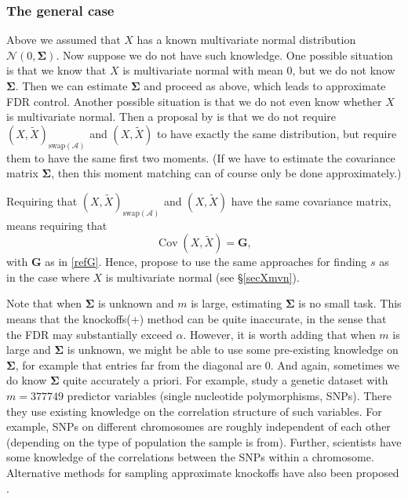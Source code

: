 \documentclass[11pt]{article}
\theoremstyle{plain}
\theoremstyle{definition}
\newcommand{\N}{\mathcal{N}}
\newcommand{\A}{\mathcal{A}}
\newcommand{\Sigm}{\mathbf{\Sigma}}
\newcommand{\citt}{\citet}
\newcommand{\citp}{\citep}
\DeclareMathOperator{\Cov}{Cov}
\begin{document}
\subsubsection{The general case}
Above we assumed that $X$ has a known multivariate normal distribution $\N(0,\Sigm)$. Now suppose we do not have such knowledge. One possible situation is that  we  know that $X$ is multivariate normal with mean 0, but we do not know $\Sigm$. Then we can estimate $\Sigm$ and proceed as above, which leads to approximate FDR control.
Another possible situation is that we do not even know whether $X$ is multivariate normal. Then a proposal by \citt{candes2018panning} is that we do not require $(X,\tilde{X})_{\text{swap}(\A)}$ and $(X,\tilde{X})$ to have exactly the same distribution, but require them to have the same first two moments. (If we have to estimate the covariance matrix $\Sigm$, then this moment matching can of course only be done approximately.)

Requiring that $(X,\tilde{X})_{\text{swap}(\A)}$ and $(X,\tilde{X})$ have the same covariance matrix, means requiring that $$\Cov(X,\tilde{X})=\mathbf{G},$$
with $\mathbf{G}$ as in \eqref{refG}. Hence, \citt[][pp.564-565]{candes2018panning} propose to use the same approaches for finding $s$ as in the case where $X$ is multivariate normal (see \S\ref{secXmvn}). 

Note that when $\Sigm$ is unknown and $m$ is large, estimating $\Sigm$ is no small task. This means that the knockoffs(+) method can be quite inaccurate, in the sense that the FDR may substantially exceed $\alpha$. However, it is worth adding that when $m$ is large and $\Sigm$ is unknown, we might be able to use some pre-existing knowledge on $\Sigm$, for example that entries far from the diagonal are 0. And again, sometimes we do know $\Sigm$ quite accurately a priori. For example, \citt{candes2018panning} study a genetic dataset with $m=377749$ predictor variables (single nucleotide polymorphisms, SNPs). There they use existing knowledge on the correlation structure of such variables. For example, SNPs on different chromosomes are roughly independent of each other (depending on the type of population the sample is from). Further, scientists have some knowledge of the correlations between the SNPs within a chromosome.
Alternative methods for sampling approximate knockoffs have also been proposed \citp{romano2020deep,blain2024knockoffs}. 
\end{document}
